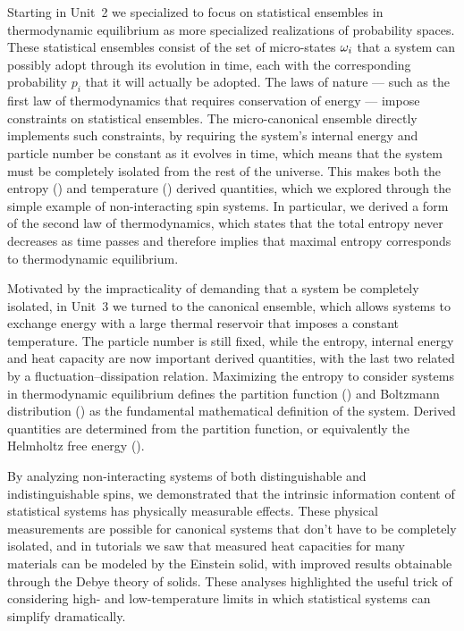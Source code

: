 Starting in Unit~2 we specialized to focus on statistical ensembles in thermodynamic equilibrium as more specialized realizations of probability spaces.
These statistical ensembles consist of the set of micro-states $\omega_i$ that a system can possibly adopt through its evolution in time, each with the corresponding probability $p_i$ that it will actually be adopted.
The laws of nature --- such as the first law of thermodynamics that requires conservation of energy --- impose constraints on statistical ensembles.
The micro-canonical ensemble directly implements such constraints, by requiring the system's internal energy and particle number be constant as it evolves in time, which means that the system must be completely isolated from the rest of the universe.
This makes both the entropy () and temperature () derived quantities, which we explored through the simple example of non-interacting spin systems.
In particular, we derived a form of the second law of thermodynamics, which states that the total entropy never decreases as time passes and therefore implies that maximal entropy corresponds to thermodynamic equilibrium.

Motivated by the impracticality of demanding that a system be completely isolated, in Unit~3 we turned to the canonical ensemble, which allows systems to exchange energy with a large thermal reservoir that imposes a constant temperature.
The particle number is still fixed, while the entropy, internal energy and heat capacity are now important derived quantities, with the last two related by a fluctuation--dissipation relation.
Maximizing the entropy to consider systems in thermodynamic equilibrium defines the partition function () and Boltzmann distribution () as the fundamental mathematical definition of the system.
Derived quantities are determined from the partition function, or equivalently the Helmholtz free energy ().

By analyzing non-interacting systems of both distinguishable and indistinguishable spins, we demonstrated that the intrinsic information content of statistical systems has physically measurable effects.
These physical measurements are possible for canonical systems that don't have to be completely isolated, and in tutorials we saw that measured heat capacities for many materials can be modeled by the Einstein solid, with improved results obtainable through the Debye theory of solids.
These analyses highlighted the useful trick of considering high- and low-temperature limits in which statistical systems can simplify dramatically.

